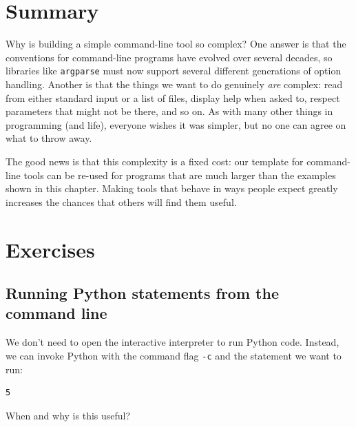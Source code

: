 \documentclass[
]{krantz}
\makeatletter
\newenvironment{Shaded}{\begin{snugshade}}{\end{snugshade}}
\newcommand{\NormalTok}[1]{#1}
\newcommand{\OperatorTok}[1]{\textcolor[rgb]{0.81,0.36,0.00}{\textbf{#1}}}
\newcommand{\StringTok}[1]{\textcolor[rgb]{0.31,0.60,0.02}{#1}}
\newenvironment{kframe}{%
\medskip{}
\setlength{\fboxsep}{.8em}
 \def\at@end@of@kframe{}%
 \ifinner\ifhmode%
  \def\at@end@of@kframe{\end{minipage}}%
  \begin{minipage}{\columnwidth}%
 \fi\fi%
 \def\FrameCommand##1{\hskip\@totalleftmargin \hskip-\fboxsep
 \colorbox{shadecolor}{##1}\hskip-\fboxsep
     \hskip-\linewidth \hskip-\@totalleftmargin \hskip\columnwidth}%
 \MakeFramed {\advance\hsize-\width
   \@totalleftmargin\z@ \linewidth\hsize
   \@setminipage}}%
 {\par\unskip\endMakeFramed%
 \at@end@of@kframe}
\renewenvironment{Shaded}{\begin{kframe}}{\end{kframe}}
\makeatother
\begin{document}
\hypertarget{scripting-summary}{%
\section{Summary}\label{scripting-summary}}

Why is building a simple command-line tool so complex?
One answer is that the conventions for command-line programs
have evolved over several decades,
so libraries like \texttt{argparse} must now support several different generations of option handling.
Another is that the things we want to do genuinely \emph{are} complex:
read from either standard input or a list of files,
display help when asked to,
respect parameters that might not be there,
and so on.
As with many other things in programming (and life),
everyone wishes it was simpler,
but no one can agree on what to throw away.

The good news is that this complexity is a fixed cost:
our template for command-line tools can be re-used for programs
that are much larger than the examples shown in this chapter.
Making tools that behave in ways people expect
greatly increases the chances that others will find them useful.

\hypertarget{scripting-exercises}{%
\section{Exercises}\label{scripting-exercises}}

\hypertarget{scripting-ex-command-line}{%
\subsection{Running Python statements from the command line}\label{scripting-ex-command-line}}

We don't need to open the interactive interpreter to run Python code.
Instead,
we can invoke Python with the command flag \texttt{-c}
and the statement we want to run:

\begin{Shaded}
\end{Shaded}

\begin{verbatim}
5
\end{verbatim}

When and why is this useful?
\end{document}
